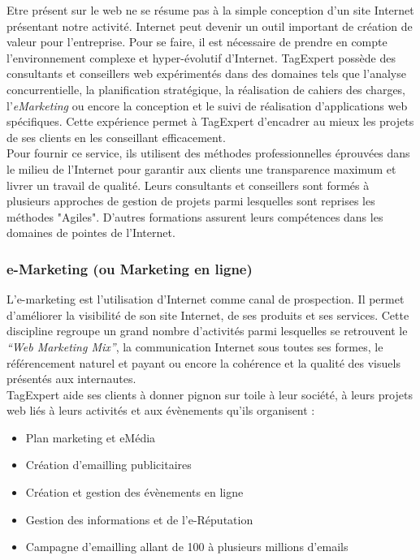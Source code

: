 \documentclass{article}
\begin{document}
\begin{sffamily}
Etre présent sur le web ne se résume pas à la simple conception d'un site Internet présentant notre activité. Internet peut devenir un outil important de création de valeur 
pour l'entreprise. Pour se faire, il est nécessaire de prendre en compte l'environnement complexe et hyper-évolutif d'Internet. TagExpert possède des consultants et 
conseillers web expérimentés dans des domaines tels que l'analyse concurrentielle, la planification stratégique, la réalisation de cahiers des charges, l'\textit{eMarketing} 
ou encore la conception et le suivi de réalisation d'applications web spécifiques. Cette expérience permet à TagExpert d'encadrer au mieux les projets de ses clients en les 
conseillant efficacement.\\

Pour fournir ce service, ils utilisent des méthodes professionnelles éprouvées dans le milieu de l'Internet pour garantir aux clients une transparence maximum et livrer un 
travail de qualité. Leurs consultants et conseillers sont formés à plusieurs approches de gestion de projets parmi lesquelles sont reprises les méthodes "Agiles". D'autres 
formations assurent leurs compétences dans les domaines de pointes de l'Internet.

\subsubsection{e-Marketing (ou Marketing en ligne)}

L'e-marketing est l'utilisation d'Internet comme canal de prospection. Il permet d'améliorer la visibilité de son site Internet, de ses produits et ses services.
Cette discipline regroupe un grand nombre d'activités parmi lesquelles se retrouvent le \textit{``Web Marketing Mix''}, la communication Internet sous toutes ses formes, le 
référencement naturel et payant ou encore la cohérence et la qualité des visuels présentés aux internautes. \\

TagExpert aide ses clients à donner pignon sur toile à leur société, à leurs projets web liés à leurs activités et aux évènements qu'ils organisent :
\begin{itemize}
\item{Plan marketing et eMédia}
\item{Création d'emailling publicitaires}
\item{Création et gestion des évènements en ligne}
\item{Gestion des informations et de l'e-Réputation}
\item{Campagne d'emailling allant de 100 à plusieurs millions d'emails} \\
\end{itemize}


\end{sffamily}
\end{document}
